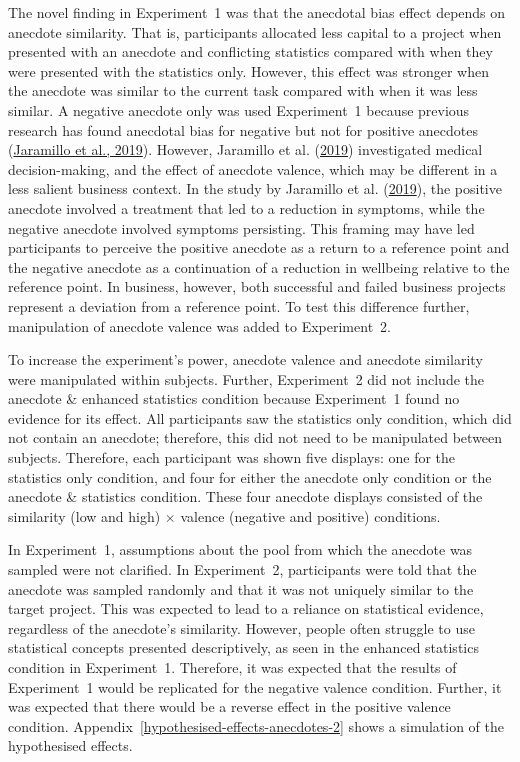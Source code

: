 \documentclass[
  man, donotrepeattitle,floatsintext]{apa7}
\theoremstyle{definition}
\theoremstyle{definition}
\theoremstyle{definition}
\theoremstyle{definition}
\theoremstyle{remark}
\begin{document}
The novel finding in Experiment~1 was that the anecdotal bias effect depends on
anecdote similarity. That is, participants allocated less capital to a project
when presented with an anecdote and conflicting statistics compared with when
they were presented with the statistics only. However, this effect was stronger
when the anecdote was similar to the current task compared with when it was less
similar. A negative anecdote only was used Experiment~1 because previous
research has found anecdotal bias for negative but not for positive anecdotes
(\protect\hyperlink{ref-jaramillo2019}{Jaramillo et al., 2019}). However, Jaramillo et al. (\protect\hyperlink{ref-jaramillo2019}{2019}) investigated medical decision-making,
and the effect of anecdote valence, which may be different in a less salient
business context. In the study by Jaramillo et al. (\protect\hyperlink{ref-jaramillo2019}{2019}), the positive anecdote involved
a treatment that led to a reduction in symptoms, while the negative anecdote
involved symptoms persisting. This framing may have led participants to perceive
the positive anecdote as a return to a reference point and the negative anecdote
as a continuation of a reduction in wellbeing relative to the reference point.
In business, however, both successful and failed business projects represent a
deviation from a reference point. To test this difference further, manipulation
of anecdote valence was added to Experiment~2.

To increase the experiment's power, anecdote valence and anecdote similarity
were manipulated within subjects. Further, Experiment~2 did not include the
anecdote \& enhanced statistics condition because Experiment~1 found no
evidence for its effect. All participants saw the statistics only condition,
which did not contain an anecdote; therefore, this did not need to be
manipulated between subjects. Therefore, each participant was shown five
displays: one for the statistics only condition, and four for either the
anecdote only condition or the anecdote \& statistics condition. These four
anecdote displays consisted of the similarity (low and high) \(\times\) valence
(negative and positive) conditions.

In Experiment~1, assumptions about the pool from which the anecdote was sampled
were not clarified. In Experiment~2, participants were told that the anecdote
was sampled randomly and that it was not uniquely similar to the target project.
This was expected to lead to a reliance on statistical evidence, regardless of
the anecdote's similarity. However, people often struggle to use statistical
concepts presented descriptively, as seen in the enhanced statistics condition
in Experiment~1. Therefore, it was expected that the results of Experiment~1
would be replicated for the negative valence condition. Further, it was expected
that there would be a reverse effect in the positive valence condition.
Appendix~\ref{hypothesised-effects-anecdotes-2} shows a simulation of the
hypothesised effects.
\end{document}
